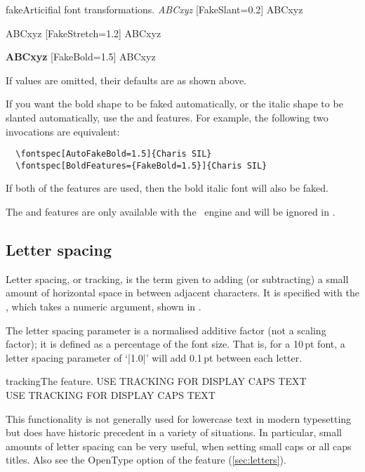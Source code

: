 \begin{Xexample}{fake}{Articifial font transformations.}
   \emph{ABCxyz} \quad
  [FakeSlant=0.2] ABCxyz

    ABCxyz \quad
  [FakeStretch=1.2] ABCxyz

   \textbf{ABCxyz} \quad
  [FakeBold=1.5] ABCxyz
\end{Xexample}

If values are omitted, their defaults are as shown above.

If you want the bold shape to be faked automatically, or the italic shape
to be slanted automatically, use the  and
 features. For example, the following two invocations
are equivalent:
\begin{Verbatim}
  \fontspec[AutoFakeBold=1.5]{Charis SIL}
  \fontspec[BoldFeatures={FakeBold=1.5}]{Charis SIL}
\end{Verbatim}
If both of the  features are used, then the bold italic
font will also be faked.

The  and  features are only available with the \XeTeX\ engine and will be ignored in \LuaTeX.


\subsection{Letter spacing}
Letter spacing, or tracking, is the term given to adding (or subtracting) a small amount of horizontal space in between adjacent characters. It is specified with the , which takes a numeric argument,
shown in .

The letter spacing parameter is a normalised additive factor (not a scaling factor); it is defined as a percentage of the font size. That is, for a 10\,pt font, a letter spacing parameter of `|1.0|' will add 0.1\,pt between each letter.

\begin{Xexample}{tracking}{The  feature.}
  USE TRACKING FOR DISPLAY CAPS TEXT \\
  USE TRACKING FOR DISPLAY CAPS TEXT
\end{Xexample}

This functionality is not generally used for lowercase text in modern typesetting but does have historic precedent in a variety of situations.
In particular, small amounts of letter spacing can be very useful, when setting small caps or all caps titles.
Also see the OpenType  option of the  feature (\vref*{sec:letters}).

